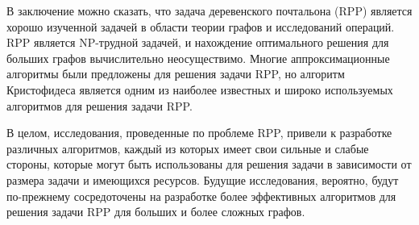 В заключение можно сказать, что задача деревенского почтальона (RPP) является хорошо изученной задачей в области теории графов и исследований операций. RPP является NP-трудной задачей, и нахождение оптимального решения для больших графов вычислительно неосуществимо. Многие аппроксимационные алгоритмы были предложены для решения задачи RPP, но алгоритм Кристофидеса является одним из наиболее известных и широко используемых алгоритмов для решения задачи RPP.

В целом, исследования, проведенные по проблеме RPP, привели к разработке различных алгоритмов, каждый из которых имеет свои сильные и слабые стороны, которые могут быть использованы для решения задачи в зависимости от размера задачи и имеющихся ресурсов. Будущие исследования, вероятно, будут по-прежнему сосредоточены на разработке более эффективных алгоритмов для решения задачи RPP для больших и более сложных графов.